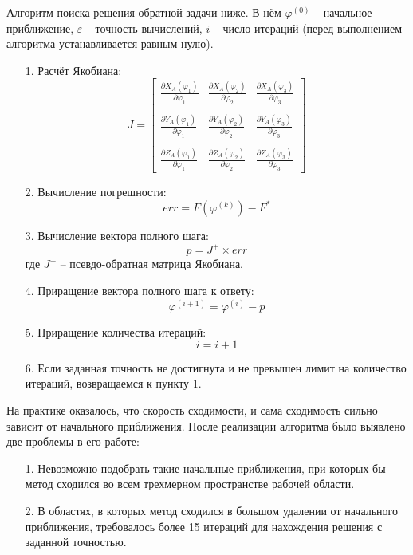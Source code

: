 Алгоритм поиска решения обратной задачи ниже. В нём $ \varphi^{(0)} $ -- начальное приближение, $ \varepsilon $ -- точность вычислений, $ i $ -- число итераций (перед выполнением алгоритма устанавливается равным нулю).
\begin{itemize}
    \item[1.] Расчёт Якобиана: $$ J = \begin{bmatrix}
        \frac{\partial X_A(\varphi_1)}{\partial \varphi_1} & 
        \frac{\partial X_A(\varphi_2)}{\partial \varphi_2} & 
        \frac{\partial X_A(\varphi_3)}{\partial \varphi_3} \\ \\
        \frac{\partial Y_A(\varphi_1)}{\partial \varphi_1} & 
        \frac{\partial Y_A(\varphi_2)}{\partial \varphi_2} & 
        \frac{\partial Y_A(\varphi_3)}{\partial \varphi_3} \\ \\
        \frac{\partial Z_A(\varphi_1)}{\partial \varphi_1} & 
        \frac{\partial Z_A(\varphi_2)}{\partial \varphi_2} & 
        \frac{\partial Z_A(\varphi_3)}{\partial \varphi_3}
    \end{bmatrix} $$
    \item[2.] Вычисление погрешности: $$ err=F(\varphi^{(k)})-F^* $$
    \item[3.] Вычисление вектора полного шага: $$ p = J^{+} \times err $$ где $ J^{+} $ -- псевдо-обратная матрица Якобиана.
    \item[4.] Приращение вектора полного шага к ответу: $$ \varphi^{(i+1)}=\varphi^{(i)} - p $$ 
    \item[5.] Приращение количества итераций: $$ i = i + 1 $$
    \item[6.] Если заданная точность не достигнута и не превышен лимит на количество итераций, возвращаемся к пункту 1.
\end{itemize}

\noindent На практике оказалось, что скорость сходимости, и сама сходимость сильно зависит от начального приближения. После реализации алгоритма было выявлено две проблемы в его работе:
\begin{itemize}
    \item[1.] Невозможно подобрать такие начальные приближения, при которых бы метод сходился во всем трехмерном пространстве рабочей области.
    \item[2.] В областях, в которых метод сходился в большом удалении от начального приближения, требовалось более 15 итераций для нахождения решения с заданной точностью.
\end{itemize}

